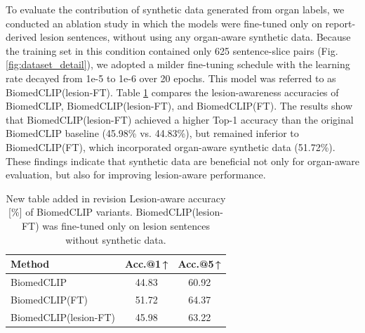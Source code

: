 \documentclass[bioengineering,article,submit,pdftex,moreauthors]{Definitions/mdpi}
\begin{document}
  To evaluate the contribution of synthetic data generated from organ labels, we conducted an ablation study in which the models were fine-tuned only on report-derived lesion sentences, without using any organ-aware synthetic data. 
  Because the training set in this condition contained only 625 sentence-slice pairs (Fig. \ref{fig:dataset_detail}), we adopted a milder fine-tuning schedule with the learning rate decayed from 1e-5 to 1e-6 over 20 epochs. 
  This model was referred to as BiomedCLIP(lesion-FT). 
  Table \ref{tab:impact} compares the lesion-awareness accuracies of BiomedCLIP, BiomedCLIP(lesion-FT), and BiomedCLIP(FT).
  The results show that BiomedCLIP(lesion-FT) achieved a higher Top-1 accuracy than the original BiomedCLIP baseline (45.98\% vs. 44.83\%), but remained inferior to BiomedCLIP(FT), which incorporated organ-aware synthetic data (51.72\%).
  These findings indicate that synthetic data are beneficial not only for organ-aware evaluation, but also for improving lesion-aware performance.


\begin{table}[ht]
  \centering
  \caption{New table added in revision Lesion-aware accuracy [\%] of BiomedCLIP variants. BiomedCLIP(lesion-FT) was fine-tuned only on lesion sentences without synthetic data.}
  \label{tab:impact}
  \begin{tabular}{lcc}
    \toprule
    Method                  & Acc.@1\,↑      & Acc.@5\,↑      \\
    \midrule
    BiomedCLIP              & 44.83       & 60.92       \\
    BiomedCLIP(FT)          & 51.72       & 64.37       \\
    BiomedCLIP(lesion-FT)   & 45.98       & 63.22       \\
    \bottomrule
  \end{tabular}
\end{table}
\end{document}
